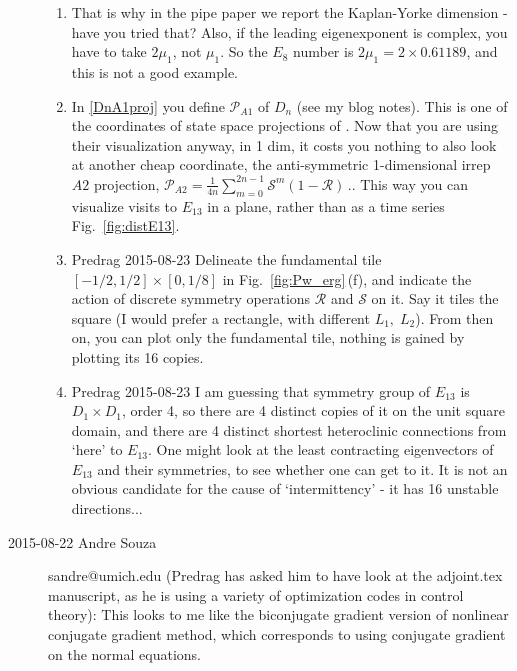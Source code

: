 \begin{description}
{\begin{enumerate}
\item
That is why in the pipe paper we report the Kaplan-Yorke dimension -
have you tried that? Also, if the leading eigenexponent is complex,
you have to take $2\mu_1$, not $\mu_1$. So the $E_8$ number is
$2\mu_1=2 \times 0.61189$, and this is not a good example.

\item
In \eqref{DnA1proj} you define ${\mathcal P}_{A1}$ of $D_n$ (see my blog notes).
This is one of the coordinates of state space projections of
. Now that you are using their visualization anyway, in 1 dim,
it costs you
nothing to also look at another cheap coordinate, the anti-symmetric 1-dimensional irrep $A2$
projection,
\(
{\mathcal P}_{A2} = \frac{1}{4n}\sum_{m=0}^{2n-1}\mathcal S^m\left(1 -\mathcal R\right)
\,.
\).
This way you can visualize visits to $E_{13}$ in a plane, rather than as a time
series Fig.~\ref{fig:distE13}.

\item Predrag 2015-08-23
    Delineate the fundamental tile $[-1/2,1/2]\times[0,1/8]$ in
    Fig.~\ref{fig:Pw_erg}\,(f), and indicate the action of discrete
    symmetry operations $\mathcal R$ and $\mathcal S$ on it. Say it tiles
    the square (I would prefer a rectangle, with different $L_1,\;L_2$).
    From then on, you can plot only the fundamental tile, nothing is gained by
    plotting its 16 copies.

\item Predrag 2015-08-23
    I am guessing that symmetry group of $E_{13}$ is $D_1 \times D_1$, order 4, so there
    are 4 distinct copies of it on the unit square domain, and there are 4 distinct
    shortest heteroclinic connections from `here' to $E_{13}$. One might look at the least
    contracting eigenvectors of $E_{13}$ and their symmetries, to see whether one can get
    to it. It is not an obvious candidate for the cause of `intermittency' - it has 16 unstable
    directions...

\end{enumerate}
}


\item[2015-08-22 Andre Souza] sandre@umich.edu (Predrag has asked him to
have look at the adjoint.tex manuscript, as he is using a variety of
optimization codes in control theory):
This looks to me like the biconjugate gradient version of
{nonlinear conjugate gradient method},
which corresponds to using conjugate gradient on the normal equations.


\end{description}
